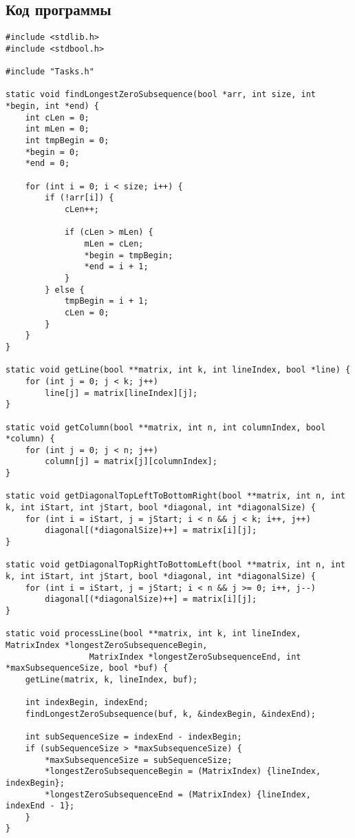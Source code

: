 \documentclass[a4paper, 12pt, oneside]{article}
\begin{document}
    \subsection{Код программы}
    \begin{verbatim}
#include <stdlib.h>
#include <stdbool.h>

#include "Tasks.h"

static void findLongestZeroSubsequence(bool *arr, int size, int *begin, int *end) {
    int cLen = 0;
    int mLen = 0;
    int tmpBegin = 0;
    *begin = 0;
    *end = 0;

    for (int i = 0; i < size; i++) {
        if (!arr[i]) {
            cLen++;

            if (cLen > mLen) {
                mLen = cLen;
                *begin = tmpBegin;
                *end = i + 1;
            }
        } else {
            tmpBegin = i + 1;
            cLen = 0;
        }
    }
}

static void getLine(bool **matrix, int k, int lineIndex, bool *line) {
    for (int j = 0; j < k; j++)
        line[j] = matrix[lineIndex][j];
}

static void getColumn(bool **matrix, int n, int columnIndex, bool *column) {
    for (int j = 0; j < n; j++)
        column[j] = matrix[j][columnIndex];
}

static void getDiagonalTopLeftToBottomRight(bool **matrix, int n, int k, int iStart, int jStart, bool *diagonal, int *diagonalSize) {
    for (int i = iStart, j = jStart; i < n && j < k; i++, j++)
        diagonal[(*diagonalSize)++] = matrix[i][j];
}

static void getDiagonalTopRightToBottomLeft(bool **matrix, int n, int k, int iStart, int jStart, bool *diagonal, int *diagonalSize) {
    for (int i = iStart, j = jStart; i < n && j >= 0; i++, j--)
        diagonal[(*diagonalSize)++] = matrix[i][j];
}

static void processLine(bool **matrix, int k, int lineIndex, MatrixIndex *longestZeroSubsequenceBegin,
                 MatrixIndex *longestZeroSubsequenceEnd, int *maxSubsequenceSize, bool *buf) {
    getLine(matrix, k, lineIndex, buf);

    int indexBegin, indexEnd;
    findLongestZeroSubsequence(buf, k, &indexBegin, &indexEnd);

    int subSequenceSize = indexEnd - indexBegin;
    if (subSequenceSize > *maxSubsequenceSize) {
        *maxSubsequenceSize = subSequenceSize;
        *longestZeroSubsequenceBegin = (MatrixIndex) {lineIndex, indexBegin};
        *longestZeroSubsequenceEnd = (MatrixIndex) {lineIndex, indexEnd - 1};
    }
}


\end{verbatim}
\end{document}
